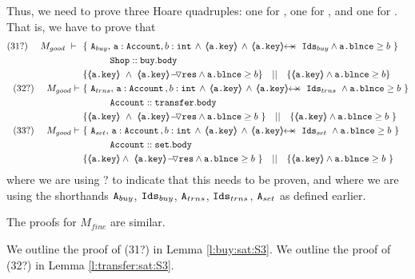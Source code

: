 \begin{proofO}
\normalsize
Thus, we need to prove  three Hoare quadruples: one for , one for  , and one for  .  That is, we have to prove that
 \small
\begin{align*}
\text{(31?)}  \ \ \ \ M_{good}\ \vdash  \  \ 
		&	\{  \ \Alocals, \, \prg{a}:\prg{Account}, b:\prg{int} \, \wedge\, {\inside{\prg{a.key}}} \, \wedge \, \protectedFrom {\prg{a.key}} {\Ids} \wedge \prg{a.\balance}\geq b \  \} \\
		& \SPT \prg{Shop}::\prg{buy}.\prg{body}\ \\  
		& \{ {\inside{\prg{a.key}}}\ \wedge\ {\PushASLong {\prg{res}} {\inside{\prg{a.key}}}}  \wedge \prg{a.\balance}\geq b \} \ \ \  || \ \ \ 
		   \{ {\inside{\prg{a.key}}}  \wedge \prg{a.\balance}\geq b \}
\\
\text{(32?)}  \ \ \ \ M_{good} \vdash \ 
		&	\{  \ \Alocalstr, \, \prg{a}:\prg{Account}\, , b:\prg{int} \, \wedge\,  {\inside{\prg{a.key}}} \, \wedge \, \protectedFrom {\prg{a.key}} {\Idstr}  \ \wedge \prg{a.\balance}\geq b \  \} \\
		& \SPT \prg{Account}::\prg{transfer}.\prg{body}\ \\  
		& \{ {\inside{\prg{a.key}}}\ \wedge\ {\PushASLong {\prg{res}} {\inside{\prg{a.key}}} } \wedge \prg{a.\balance}\geq b \  \} \ \ \  || \ \ \ 
		   \{ {\inside{\prg{a.key}}} \wedge \prg{a.\balance}\geq b \  \}
\\
\text{(33?)}  \ \ \ \ M_{good} \vdash \ 
		&	\{  \ \Alocalsset, \, \prg{a}:\prg{Account}\, , b:\prg{int} \, \wedge\,  {\inside{\prg{a.key}}} \, \wedge \, \protectedFrom {\prg{a.key}} {\Idsset}  \ \wedge \prg{a.\balance}\geq b \  \} \\
		& \SPT \prg{Account}::\prg{set}.\prg{body}\ \\  
 		& \{ {\inside{\prg{a.key}}}  \wedge\ {\PushASLong {\prg{res}} {\inside{\prg{a.key}}}}   \wedge \prg{a.\balance}\geq b \  \}\ \ \  || \ \ \ 
		   \{ {\inside{\prg{a.key}}} \wedge \prg{a.\balance}\geq b \  \} 
\end{align*}
\normalsize
where we are using ? to indicate that this needs to be proven, and 
where we are using the shorthands $\mbox{\normalfont{\texttt{A}}}_{buy}$,   $\mbox{\normalfont{\texttt{Ids}}}_{buy}$, $\mbox{\normalfont{\texttt{A}}}_{trns}$, $\mbox{\normalfont{\texttt{Ids}}}_{trns}$, $\mbox{\normalfont{\texttt{A}}}_{set}$ as defined earlier.

 \end{proofO}
 
The proofs for $M_{fine}$ are similar.

%
 We outline the proof of (31?) in Lemma \ref{l:buy:sat:S3}. %
 We outline the proof of (32?) in  Lemma \ref{l:transfer:sat:S3}.

